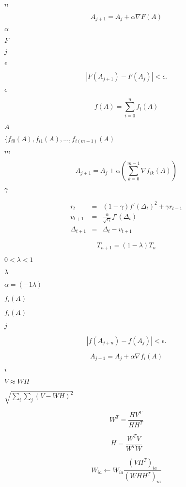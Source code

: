 \documentclass{article}
\begin{document}
$n$
\pagebreak

\[ A_{j + 1} = A_j + \alpha \nabla F(A) \]
\pagebreak

$ \alpha $
\pagebreak

$ F $
\pagebreak

$ j $
\pagebreak

$ \epsilon $
\pagebreak

\[ | F(A_{j + 1}) - F(A_j) | < \epsilon. \]
\pagebreak

$\epsilon$
\pagebreak

\[ f(A) = \sum_{i = 0}^{n} f_i(A) \]
\pagebreak

$ A $
\pagebreak

$ \{ f_{i0}(A), f_{i1}(A), \ldots, f_{i(m - 1)}(A) $
\pagebreak

$ m $
\pagebreak

\[ A_{j + 1} = A_j + \alpha \left(\sum_{k = 0}^{m - 1} \nabla f_{ik}(A) \right) \]
\pagebreak

$ \gamma $
\pagebreak

\begin{eqnarray*} r_t &=& (1 - \gamma) f'(\Delta_t)^2 + \gamma r_{t - 1} \\ v_{t + 1} &=& \frac{\alpha}{\sqrt{r_t}}f'(\Delta_t) \\ \Delta_{t + 1} &=& \Delta_t - v_{t + 1} \end{eqnarray*}
\pagebreak

\[ T_{n+1} = (1-\lambda) T_{n} \]
\pagebreak

$ 0<\lambda<1 $
\pagebreak

$ \lambda $
\pagebreak

$ \alpha = (-1 \lambda) $
\pagebreak

$ f_i(A) $
\pagebreak

$ f_i(A)$
\pagebreak

$ j$
\pagebreak

\[ | f(A_{j + n}) - f(A_j) | < \epsilon. \]
\pagebreak

\[ A_{j + 1} = A_j + \alpha \nabla f_i(A) \]
\pagebreak

$ i $
\pagebreak

$ V \approx WH $
\pagebreak

$ \sqrt{\sum_i \sum_j(V-WH)^2} $
\pagebreak

\[ W^T = \frac{H V^T}{H H^T} \]
\pagebreak

\[ H = \frac{W^T V}{W^T W} \]
\pagebreak

\[ W_{ia} \leftarrow W_{ia} \frac{(VH^T)_{ia}}{(WHH^T)_{ia}} \]
\pagebreak
\end{document}

